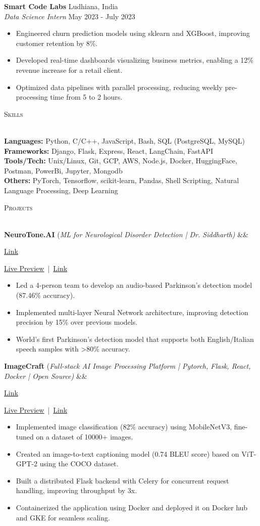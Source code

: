 \documentclass[a4paper]{article}
\newcommand{\bulletSep} { \vspace{1.5mm} }
\newcommand{\sectionSep} { \vspace{2.5mm} }
\newcommand{\lineunder} {
    \vspace*{-8pt} \\
    \hspace*{-15pt} \hrulefill \\
}
\newcommand{\header} [1] {
    {\hspace*{-18pt}\vspace*{6pt} {
        \fontfamily{qcs}\selectfont \large \scshape #1
    }}
    \vspace*{-6pt} \lineunder
    \vspace{1.1mm}
}
\newcommand{\experienceItem}[5]{
    \textbf{#1} \hfill #2 \\
    \textit{#3} \hfill #4 \\
    #5
}
\newcommand{\linkFont}[1]{
    {\fontfamily{lmtt}\selectfont#1}
}
\newcommand{\link}[2]{
    {\fontfamily{lmtt}\selectfont\href{#1}{#2}}
}
\newcommand{\projectItem}[5]{
    {\textbf{#1}} {(\sl #2)}\hfill
    \ifx&#3&%
    \link{#4}{Link}\\
    \else
    \linkFont{\href{#3}{Live Preview}~|~\href{#4}{Link}}\\
    \fi
    \vspace{2pt}
    \begin{itemize}
        #5
    \end{itemize}
}
\begin{document}
\experienceItem{Smart Code Labs}{Ludhiana, India}{Data Science Intern}{May 2023 - July 2023}{
    \begin{itemize}
        \item Engineered churn prediction models using sklearn and XGBoost, improving customer retention by 8\%.
        \item Developed real-time dashboards visualizing business metrics, enabling a 12\% revenue increase for a retail client.
        \item Optimized data pipelines with parallel processing, reducing weekly pre-processing time from 5 to 2 hours.

    \end{itemize}
}
\sectionSep


\header{Skills}

\textbf{Languages:} Python, C/C++, JavaScript, Bash, SQL (PostgreSQL, MySQL) 
\\
\textbf{Frameworks:} Django, Flask, Express, React, LangChain, FastAPI \\
\textbf{Tools/Tech:} Unix/Linux, Git, GCP, AWS, Node.js, Docker, HuggingFace, Postman, PowerBi, Jupyter, Mongodb \\
\textbf{Others:} PyTorch, Tensorflow, scikit-learn, Pandas, Shell Scripting, Natural Language Processing, Deep Learning

\sectionSep


\header{Projects}

\projectItem{NeuroTone.AI}{ML for Neurological Disorder Detection | Dr. Siddharth} {}{https://ai3011.plaksha.edu.in/spring2024.html\#parkinson}{
    \item Led a 4-person team to develop an audio-based Parkinson's detection model (87.46\% accuracy).
    \item Implemented multi-layer Neural Network architecture, improving detection precision by 15\% over previous models.
    \item World's first Parkinson's detection model that supports both English/Italian speech samples with >80\% accuracy.
}
\bulletSep

\projectItem{ImageCraft}{Full-stack AI Image Processing Platform | Pytorch, Flask, React, Docker | Open Source}{}{https://github.com/pratikranaa/imagecraft}{
    \item Implemented image classification (82\% accuracy) using MobileNetV3, fine-tuned on a dataset of 10000+ images.
    \item Created an image-to-text captioning model (0.74 BLEU score) based on ViT-GPT-2 using the COCO dataset.
    \item Built a distributed Flask backend with Celery for concurrent request handling, improving throughput by 3x.
    \item Containerized the application using Docker and deployed it on Docker hub and GKE for seamless scaling.
}
\bulletSep
\end{document}
